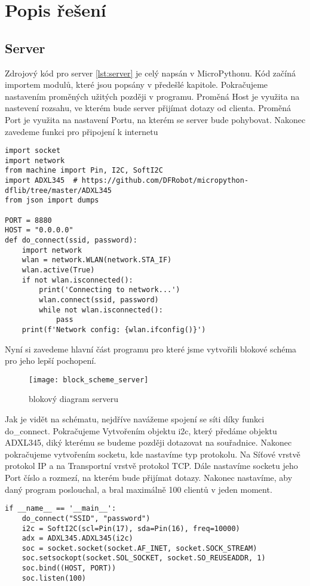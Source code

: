 \documentclass[12pt]{report}			%
\begin{document}
\section{Popis řešení}
\subsection{Server}
Zdrojový kód pro server \ref{lst:server} je celý napsán v MicroPythonu. Kód začíná importem modulů, které jsou popsány v předešlé kapitole. Pokračujeme nastavením proměných užitých později v programu. Proměná Host je využita na nastevení rozsahu, ve kterém bude server přijímat dotazy od clienta. Proměná Port je využita na nastavení Portu, na kterém se server bude pohybovat. Nakonec zavedeme funkci pro připojení k internetu
\begin{lstlisting}[title={Program server.py}, caption={server.py}]
import socket
import network
from machine import Pin, I2C, SoftI2C
import ADXL345  # https://github.com/DFRobot/micropython-dflib/tree/master/ADXL345
from json import dumps

PORT = 8880
HOST = "0.0.0.0"
def do_connect(ssid, password):
    import network
    wlan = network.WLAN(network.STA_IF)
    wlan.active(True)
    if not wlan.isconnected():
        print('Connecting to network...')
        wlan.connect(ssid, password)
        while not wlan.isconnected():
            pass
    print(f'Network config: {wlan.ifconfig()}')

\end{lstlisting}
Nyní si zavedeme hlavní část programu pro které jsme vytvořili blokové schéma pro jeho lepší pochopení. 
\begin{figure}
\caption{blokový diagram serveru}
\centering
 \texttt{[image: block\_scheme\_server]}
\end{figure}

Jak je vidět na schématu, nejdříve navážeme spojení se síti díky funkci do\_connect. Pokračujeme Vytvořením objektu i2c, který předáme objektu ADXL345, diký kterému se budeme později dotazovat na souřadnice. Nakonec pokračujeme vytvořením socketu, kde nastavíme typ protokolu. Na Síťové vrstvě protokol IP a na Transportní vrstvě protokol TCP. Dále nastavíme socketu jeho Port číslo a rozmezí, na kterém bude přijímat dotazy. Nakonec nastavíme, aby daný program poslouchal, a bral maximálně 100 clientů v jeden moment. 
\begin{lstlisting}[title={Program server.py}, caption={server.py}]
if __name__ == '__main__':
    do_connect("SSID", "password")
    i2c = SoftI2C(scl=Pin(17), sda=Pin(16), freq=10000)
    adx = ADXL345.ADXL345(i2c)
    soc = socket.socket(socket.AF_INET, socket.SOCK_STREAM)
    soc.setsockopt(socket.SOL_SOCKET, socket.SO_REUSEADDR, 1)
    soc.bind((HOST, PORT))
    soc.listen(100)
\end{lstlisting}
\end{document}
